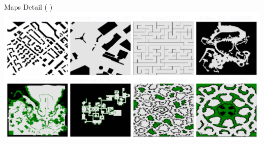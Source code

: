 \documentclass[aspectratio=169]{beamer}
\begin{document}
\begin{frame}{Maps Detail {\Medium \color{white}( \cite{sturtevant2012benchmarks})}}
    \includegraphics[width=1.0\linewidth, keepaspectratio]{figures/show_maps.pdf}
\end{frame}
\end{document}
